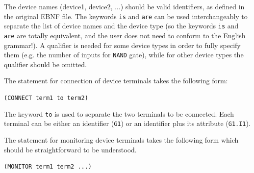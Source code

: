 \documentclass[12pt]{article}
\def\n{\noindent}
\begin{document}
\n The device names (device1, device2, ...) should be valid identifiers, as
defined in the original EBNF file. The keywords \texttt{is} and \texttt{are} can
be used interchangeably to separate the list of device names and the device type
(so the keywords \texttt{is} and \texttt{are} are totally equivalent, and the
user does not need to conform to the English grammar!). A qualifier is needed
for some device types in order to fully specify them (e.g. the number of inputs
for \texttt{NAND} gate), while for other device types the qualifier should be
omitted. \vspace{0.3cm}

\n The statement for connection of device terminals takes the following form:

\vspace{0.5cm} \texttt{(CONNECT term1 to term2)} \vspace{0.5cm}

\n The keyword \texttt{to} is used to separate the two terminals to be connected.
Each terminal can be either an identifier (\texttt{G1}) or an identifier plus
its attribute (\texttt{G1.I1}).
\vspace{0.3cm}

\n The statement for monitoring device terminals takes the following form which should be straightforward to be understood.

\vspace{0.5cm} \texttt{(MONITOR term1 term2 ...)}
\end{document}
